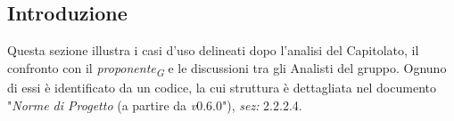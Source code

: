 \subsection{Introduzione}
Questa sezione illustra i casi d'uso delineati dopo l'analisi del Capitolato, il confronto con il \textit{proponente}\textsubscript{\textit{G}} e le discussioni tra gli Analisti del gruppo. Ognuno di essi è identificato da un codice, la cui struttura è dettagliata nel documento "\textit{Norme di Progetto} (a partire da \textit{v}0.6.0"), \textit{sez:} 2.2.2.4.